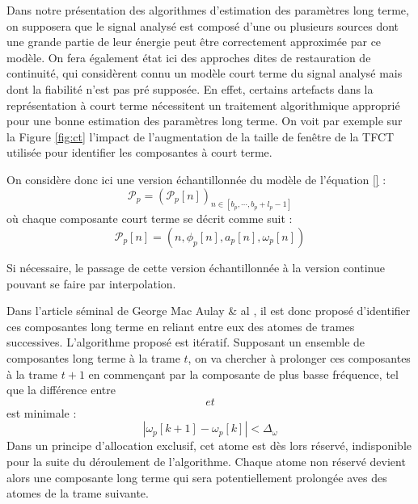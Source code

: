 Dans notre présentation des algorithmes d'estimation des paramètres long terme, on supposera que le signal analysé est composé d'une ou plusieurs sources dont une grande partie de leur énergie peut être correctement approximée par ce modèle. On fera également état ici des approches dites de \og restauration \fg de continuité, qui considèrent connu un modèle court terme du signal analysé mais dont la fiabilité n'est pas pré supposée. En effet, certains artefacts dans la représentation à court terme nécessitent un traitement algorithmique approprié pour une bonne estimation des paramètres long terme. On voit par exemple sur la Figure \ref{fig:ct} l'impact de l'augmentation de la taille de fenêtre de la TFCT utilisée pour identifier les composantes à court terme.

On considère donc ici une version échantillonnée du modèle de l'équation \ref{} :
\begin{equation}
\mathcal{P}_{p}=\left(\mathcal{P}_{p}[n]\right)_{n \in\left[b_{p}, \cdots, b_{p}+l_{p}-1\right]}
\end{equation}
où chaque composante court terme se décrit comme suit :
\begin{equation}
\mathcal{P}_{p}[n]=\left(n, \phi_{p}[n], a_{p}[n], \omega_{p}[n]\right)
\end{equation}

Si nécessaire, le passage de cette version échantillonnée à la version continue pouvant se faire par interpolation.

Dans l'article séminal de George Mac Aulay \& al \cite{mcaulay}, il est donc proposé \og d'identifier \fg ces composantes long terme en reliant entre eux des atomes de trames successives. L'algorithme proposé est itératif. Supposant un ensemble de composantes long terme à la trame $t$, on va chercher à prolonger ces composantes à la trame $t+1$ en commençant par la composante de plus basse fréquence, tel que la différence entre $$ et $$ est minimale :
\begin{equation}
\left|\omega_{p}[k+1]-\omega_{p}[k]\right|<\Delta_{\omega}
\label{eq:cst}
\end{equation}
Dans un principe d'allocation exclusif, cet atome est dès lors réservé, indisponible pour la suite du déroulement de l'algorithme. Chaque atome non réservé devient alors une composante long terme qui sera potentiellement prolongée aves des atomes de la trame suivante.

